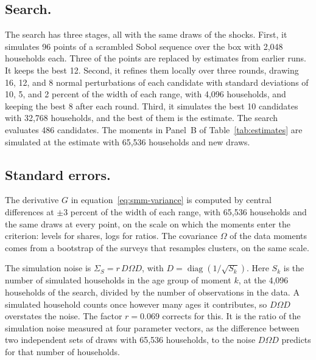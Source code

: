 \subsection{Search.}\label{app:computation-search}
The search has three stages, all with the same draws of the shocks. First,
it simulates 96 points of a scrambled Sobol sequence over the box with
2,048 households each. Three of the points are replaced by estimates from
earlier runs. It keeps the best 12. Second, it refines them locally over
three rounds, drawing 16, 12, and 8 normal perturbations of each candidate
with standard deviations of 10, 5, and 2 percent of the width of each
range, with 4,096 households, and keeping the best 8 after each round.
Third, it simulates the best 10 candidates with 32,768 households, and the
best of them is the estimate. The search evaluates 486 candidates. The
moments in Panel~B of Table~\ref{tab:estimates} are simulated at the estimate with 65,536
households and new draws.


\subsection{Standard errors.}\label{app:computation-se}
The derivative $G$ in equation~\eqref{eq:smm-variance} is computed by
central differences at $\pm3$ percent of the width of each range, with
65,536 households and the same draws at every point, on the scale on which
the moments enter the criterion: levels for shares, logs for ratios. The
covariance $\Omega$ of the data moments comes from a bootstrap of the
surveys that resamples clusters, on the same scale.

The simulation noise is $\Sigma_S=r\,D\Omega D$, with
$D=\operatorname{diag}(1/\sqrt{S_k})$. Here $S_k$ is the number of simulated
households in the age group of moment $k$, at the 4,096 households of the
search, divided by the number of observations in the data. A simulated
household counts once however many ages it contributes, so $D\Omega D$
overstates the noise. The factor $r=0.069$ corrects for this. It is the
ratio of the simulation noise measured at four parameter vectors, as the
difference between two independent sets of draws with 65,536 households, to
the noise $D\Omega D$ predicts for that number of households.
